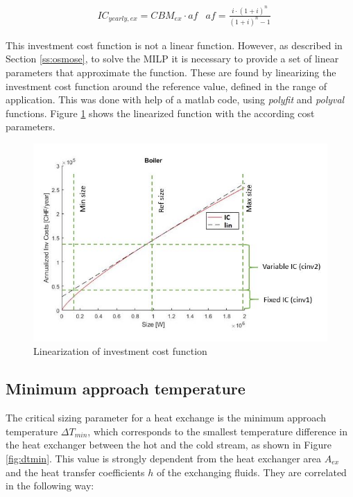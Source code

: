\documentclass{article}
\begin{document}
\begin{align}
	& IC_{yearly,ex} = CBM_{ex} \cdot af 
	& af = \frac{i \cdot (1 + i)^n}{(1 + i)^n - 1}
\end{align}

This investment cost function is not a linear function. However, as described in Section \ref{ss:osmose}, to solve the MILP it is necessary to provide a set of linear parameters that approximate the function. These are found by linearizing the investment cost function around the reference value, defined in the range of application. This was done with help of a matlab code, using \textit{polyfit} and \textit{polyval} functions. Figure \ref{fig:lin} shows the linearized function with the according cost parameters.

\begin{figure}[htp]
	\centering
	\includegraphics[scale=0.6]{Images/linearization_expl.jpg}
	\caption{Linearization of investment cost function}
	\label{fig:lin}
\end{figure}

\subsection{Minimum approach temperature}\label{ss:dtmin}
The critical sizing parameter for a heat exchange is the minimum approach temperature $\Delta T_{min}$, which corresponds to the smallest temperature difference in the heat exchanger between the hot and the cold stream, as shown in Figure \ref{fig:dtmin}. This value is strongly dependent from the heat exchanger area $A_{ex}$ and the heat transfer coefficients $h$ of the exchanging fluids. They are correlated in the following way: 
\end{document}
